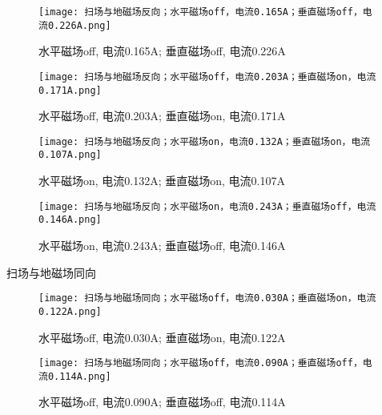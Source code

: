 \begin{figure}[H]
    \centering
    \begin{minipage}{0.45\textwidth}
        \texttt{[image: 扫场与地磁场反向；水平磁场off，电流0.165A；垂直磁场off，电流0.226A.png]}
        \caption{水平磁场off, 电流0.165A; 垂直磁场off, 电流0.226A}
        \label{fig:img1}
    \end{minipage}
       \hfill
    \begin{minipage}{0.45\textwidth}
        \texttt{[image: 扫场与地磁场反向；水平磁场off，电流0.203A；垂直磁场on，电流0.171A.png]}
        \caption{水平磁场off, 电流0.203A; 垂直磁场on, 电流0.171A}
        \label{fig:img2}
    \end{minipage}
\end{figure}

\begin{figure}[H]
    \centering
    \begin{minipage}{0.45\textwidth}
        \texttt{[image: 扫场与地磁场反向；水平磁场on，电流0.132A；垂直磁场on，电流0.107A.png]}
        \caption{水平磁场on, 电流0.132A; 垂直磁场on, 电流0.107A}
        \label{fig:img3}
    \end{minipage}%
       \hfill
    \begin{minipage}{0.45\textwidth}
        \texttt{[image: 扫场与地磁场反向；水平磁场on，电流0.243A；垂直磁场off，电流0.146A.png]}
        \caption{水平磁场on, 电流0.243A; 垂直磁场off, 电流0.146A}
        \label{fig:img4}
    \end{minipage}
\end{figure}

扫场与地磁场同向

\begin{figure}[H]
    \centering
    \begin{minipage}{0.45\textwidth}
        \texttt{[image: 扫场与地磁场同向；水平磁场off，电流0.030A；垂直磁场on，电流0.122A.png]}
        \caption{水平磁场off, 电流0.030A; 垂直磁场on, 电流0.122A}
        \label{fig:img5}
    \end{minipage}%
       \hfill
    \begin{minipage}{0.45\textwidth}
        \texttt{[image: 扫场与地磁场同向；水平磁场off，电流0.090A；垂直磁场off，电流0.114A.png]}
        \caption{水平磁场off, 电流0.090A; 垂直磁场off, 电流0.114A}
        \label{fig:img6}
    \end{minipage}
\end{figure}

